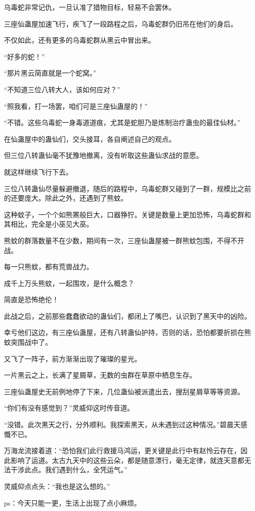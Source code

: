 \begin{this_body}
乌毒蛇非常记仇，一旦认准了猎物目标，轻易不会罢休。

三座仙蛊屋加速飞行，疾飞了一段路程之后，乌毒蛇群仍旧吊在他们的身后。

不仅如此，还有更多的乌毒蛇群从黑云中冒出来。

“好多的蛇！”

“那片黑云简直就是一个蛇窝。”

“不知道三位八转大人，该如何应对？”

“照我看，打一场罢，咱们可是三座仙蛊屋的！”

“不错。这些乌毒蛇一身毒道道痕，尤其是蛇胆乃是炼制治疗蛊虫的最佳仙材。”

在仙蛊屋中的蛊仙们，交头接耳，各自阐述自己的观点。

但三位八转蛊仙毫不犹豫地撤离，没有听取这些蛊仙求战的意愿。

就这样继续飞行下去。

三位八转蛊仙尽量躲避撤退，随后的路程中，乌毒蛇群又碰到了一群，规模比之前的还要庞大。除此之外，还遇到了熊蚊。

这种蚊子，一个个如熊罴般巨大，口器狰狞。关键是数量上更加恐怖，乌毒蛇群和其相比，完全是小巫见大巫。

熊蚊的群落数量不在少数，期间有一次，三座仙蛊屋被一群熊蚊包围，不得不开战。

每一只熊蚊，都有荒兽战力。

成千上万头熊蚊，一起围攻，是什么概念？

简直是恐怖绝伦！

此战之后，之前那些蠢蠢欲动的蛊仙们，都闭上了嘴巴，认识到了黑天中的凶险。

幸亏他们这边，有三座仙蛊屋，还有八转蛊仙护持，否则的话，恐怕都要折损在熊蚊突围战中了。

又飞了一阵子，前方渐渐出现了璀璨的星光。

一片黑云之上，长满了星屑草，无数的虫群在草原中栖息生存。

三座仙蛊屋史无前例地停了下来，几位蛊仙被派遣出去，搜刮星屑草等等资源。

“你们有没有感觉到？”灵威仰这时传音道。

“没错。此次黑天之行，分外顺利。我探索黑天，从未遇到过这种情况。”碧晨天感慨不已。

万海龙流接着道：“恐怕我们此行救援马鸿运，更关键是此行中有赵怜云存在，因此影响了运道。太古九天中的这些云朵，都是随意漂行，毫无定律，就连天意都无法干涉此点。我们遇到什么，全凭运气。”

灵威仰点点头：“我也是这么想的。”

ps：今天只能一更，生活上出现了点小麻烦。

\end{this_body}

